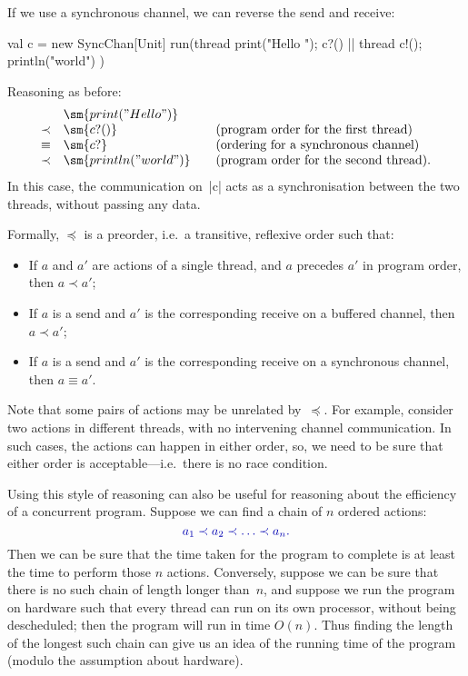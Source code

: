 If we use a synchronous channel, we can reverse the send and receive:
%
\begin{scala}
  val c = new SyncChan[Unit]
  run(thread{ print("Hello "); c?() } || thread{ c!(); println("world") })
\end{scala}
%
Reasoning as before:
\[
\begin{array}{cl@{\qquad}l}
& \sm{print("Hello ")} \\
\prec & \sm{c?()} & \mbox{(program order for the first thread)} \\
\equiv & \sm{c?{}} & \mbox{(ordering for a synchronous channel)} \\
\prec & \sm{println("world")} & \mbox{(program order for the second thread).}
\end{array}
\]
In this case, the communication on~|c| acts as a synchronisation between the
two threads, without passing any data.
  
Formally, $\preceq$ is a preorder, i.e.~a transitive, reflexive order such
that:
%
\begin{itemize}
\item
If $a$ and $a'$ are actions of a single thread, and $a$ precedes $a'$ in
program order, then $a \prec a'$;

\item
If $a$ is a send and $a'$ is the corresponding receive on a buffered channel,
then $a \prec a'$;

\item
If $a$ is a send and $a'$ is the corresponding receive on a synchronous
channel, then $a \equiv a'$.
\end{itemize}

Note that some pairs of actions may be unrelated by~$\preceq$.  For example,
consider two actions in different threads, with no intervening channel
communication.  In such cases, the actions can happen in either order, so, we
need to be sure that either order is acceptable---i.e.~there is no race
condition.

Using this style of reasoning can also be useful for reasoning about the
efficiency of a concurrent program.  Suppose we can find a chain of $n$
ordered actions:
\[
\mstyle
a_1 \prec a_2 \prec \ldots \prec a_n. 
\]
Then we can be sure that the time taken for the program to complete is at
least the time to perform those $n$ actions.  Conversely, suppose we can be
sure that there is no such chain of length longer than~$n$, and suppose we run
the program on hardware such that every thread can run on its own processor,
without being descheduled; then the program will run in time $O(n)$.  Thus
finding the length of the longest such chain can give us an idea of the
running time of the program (modulo the assumption about hardware).

